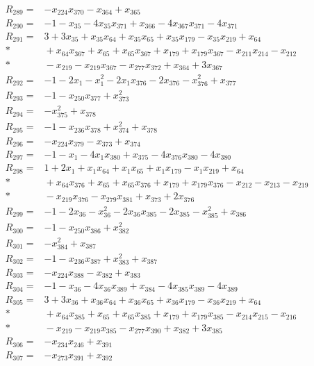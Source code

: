 \begin{align*}
R_{289}={}&-x_{224}x_{370}-x_{364}+x_{365}\\[3pt]
R_{290}={}&-1-x_{35}-4x_{35}x_{371}+x_{366}-4x_{367}x_{371}-4x_{371}\\[3pt]
R_{291}={}&3+3x_{35}+x_{35}x_{64}+x_{35}x_{65}+x_{35}x_{179}-x_{35}x_{219}+x_{64}\\*
&{}+x_{64}x_{367}+x_{65}+x_{65}x_{367}+x_{179}+x_{179}x_{367}-x_{211}x_{214}-x_{212}\\*
&{}-x_{219}-x_{219}x_{367}-x_{277}x_{372}+x_{364}+3x_{367}\\[3pt]
R_{292}={}&-1-2x_{1}-x_{1}^{2}-2x_{1}x_{376}-2x_{376}-x_{376}^{2}+x_{377}\\[3pt]
R_{293}={}&-1-x_{250}x_{377}+x_{373}^{2}\\[3pt]
R_{294}={}&-x_{375}^{2}+x_{378}\\[3pt]
R_{295}={}&-1-x_{236}x_{378}+x_{374}^{2}+x_{378}\\[3pt]
R_{296}={}&-x_{224}x_{379}-x_{373}+x_{374}\\[3pt]
R_{297}={}&-1-x_{1}-4x_{1}x_{380}+x_{375}-4x_{376}x_{380}-4x_{380}\\[3pt]
R_{298}={}&1+2x_{1}+x_{1}x_{64}+x_{1}x_{65}+x_{1}x_{179}-x_{1}x_{219}+x_{64}\\*
&{}+x_{64}x_{376}+x_{65}+x_{65}x_{376}+x_{179}+x_{179}x_{376}-x_{212}-x_{213}-x_{219}\\*
&{}-x_{219}x_{376}-x_{279}x_{381}+x_{373}+2x_{376}\\[3pt]
R_{299}={}&-1-2x_{36}-x_{36}^{2}-2x_{36}x_{385}-2x_{385}-x_{385}^{2}+x_{386}\\[3pt]
R_{300}={}&-1-x_{250}x_{386}+x_{382}^{2}\\[3pt]
R_{301}={}&-x_{384}^{2}+x_{387}\\[3pt]
R_{302}={}&-1-x_{236}x_{387}+x_{383}^{2}+x_{387}\\[3pt]
R_{303}={}&-x_{224}x_{388}-x_{382}+x_{383}\\[3pt]
R_{304}={}&-1-x_{36}-4x_{36}x_{389}+x_{384}-4x_{385}x_{389}-4x_{389}\\[3pt]
R_{305}={}&3+3x_{36}+x_{36}x_{64}+x_{36}x_{65}+x_{36}x_{179}-x_{36}x_{219}+x_{64}\\*
&{}+x_{64}x_{385}+x_{65}+x_{65}x_{385}+x_{179}+x_{179}x_{385}-x_{214}x_{215}-x_{216}\\*
&{}-x_{219}-x_{219}x_{385}-x_{277}x_{390}+x_{382}+3x_{385}\\[3pt]
R_{306}={}&-x_{234}x_{246}+x_{391}\\[3pt]
R_{307}={}&-x_{273}x_{391}+x_{392}\\[3pt]

\end{align*}
